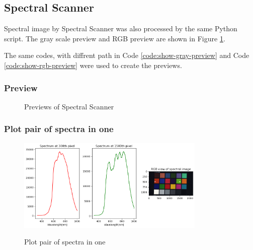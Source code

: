 \subsection{Spectral Scanner}

Spectral image by Spectral Scanner was also processed by    the same Python script. The gray scale preview and RGB preview are shown in Figure \ref{fig:spectral-preview}.

The same codes, with diffrent path in Code \ref{code:show-gray-preview} and Code \ref{code:show-rgb-preview} were used to create the previews.

\subsubsection{Preview}

\begin{figure}[H] %
  \centering
  \hspace{0.1cm}
  \caption[]{Previews of Spectral Scanner}
  \label{fig:spectral-preview}
\end{figure}

\subsubsection{Plot pair of spectra in one}

\begin{figure}[H]
  \centering
  \caption{Plot pair of spectra in one}
  \includegraphics[width=0.8\textwidth]{fig-task1/spectral-scanner-plot.png}
  \label{fig:spectral-plot}
\end{figure}
